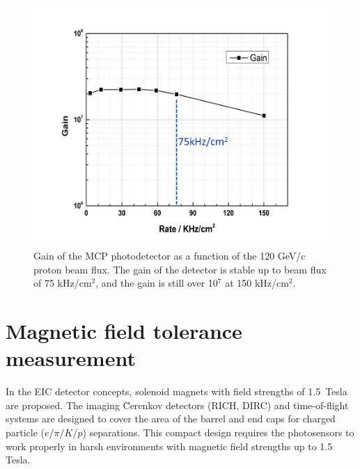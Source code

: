 \documentclass[preprint,5p]{elsarticle}
\begin{document}
\begin{figure}[tbp]
\centering 
\includegraphics[scale=0.25]{fig/MCPs_gain_proton_beam.png}
\caption{Gain of the MCP photodetector as a function of the 120 GeV/c proton 
beam flux. The gain of the detector is stable up to beam flux of 75 kHz/cm$^2$, 
and the gain is still over 10$^7$ at 150 kHz/cm$^2$. } 
\label{fig:MCPs_gain_proton_beam}
\end{figure}

\section{Magnetic field tolerance measurement}\label{sec_B_measurement}
In the EIC detector concepts, solenoid magnets with field strengths of 
1.5~Tesla are proposed. The imaging \u Cerenkov detectors (RICH, DIRC) and 
time-of-flight systems are designed to cover the area of the barrel and end 
caps for charged particle ($e$/$\pi$/$K$/$p$) separations. This compact design 
requires the photosensors to work properly in harsh environments with magnetic 
field strengths up to 1.5 Tesla. 
\end{document}
